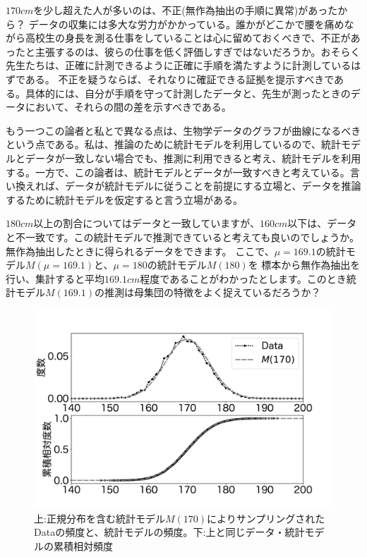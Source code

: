 \begin{SMbox}{$170cm$を少し超えた人が多いのは、不正(無作為抽出の手順に異常)があったから？}
データの収集には多大な労力がかかっている。誰かがどこかで腰を痛めながら高校生の身長を測る仕事をしていることは心に留めておくべきで、不正があったと主張するのは、彼らの仕事を低く評価しすぎではないだろうか。おそらく先生たちは、正確に計測できるように正確に手順を満たすように計測しているはずである。
不正を疑うならば、それなりに確証できる証拠を提示すべきである。具体的には、自分が手順を守って計測したデータと、先生が測ったときのデータにおいて、それらの間の差を示すべきである。



もう一つこの論者と私とで異なる点は、生物学データのグラフが曲線になるべきという点である。私は、推論のために統計モデルを利用しているので、統計モデルとデータが一致しない場合でも、推測に利用できると考え、統計モデルを利用する。一方で、この論者は、統計モデルとデータが一致すべきと考えている。言い換えれば、データが統計モデルに従うことを前提にする立場と、データを推論するために統計モデルを仮定すると言う立場がある。

$180cm$以上の割合についてはデータと一致していますが、$160cm$以下は、データと不一致です。この統計モデルで推測できていると考えても良いのでしょうか。
無作為抽出したときに得られるデータをできます。
ここで、$\mu=169.1$の統計モデル$M(\mu=169.1)$と、$\mu=180$の統計モデル$M(180)$を
標本から無作為抽出を行い、集計すると平均$169.1cm$程度であることがわかったとします。このとき統計モデル$M(169.1)$の推測は母集団の特徴をよく捉えているだろうか？
\fi 
\end{SMbox}

\begin{figure}
    \begin{center}
        \includegraphics[width=15cm]{./image/03_/cm_data_simulation.pdf}
        \caption{上:正規分布を含む統計モデル$M(170)$によりサンプリングされたDataの頻度と、統計モデルの頻度。下:上と同じデータ・統計モデルの累積相対頻度}
        \label{fig:simulation_height_men}
    \end{center}
\end{figure}

